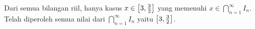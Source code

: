 \documentclass{article}
\begin{document}
\begin{enumerate}[leftmargin=*, label={\arabic*}.]
Dari semua bilangan riil, hanya kasus $x\in \cic*{3,\frac{3}{2}}$ yang memenuhi $x\in \bigcap_{n=1}^{\infty}I_n$.
Telah diperoleh semua nilai dari $\bigcap_{n=1}^{\infty}I_n$ yaitu $\cic*{3,\frac{3}{2}}$.



\end{enumerate}
\end{document}
